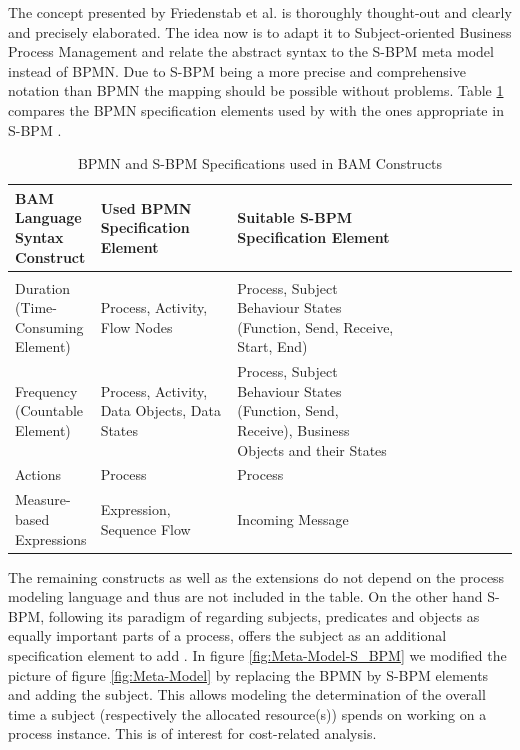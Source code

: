 The concept presented by Friedenstab et al. is thoroughly thought-out and clearly and precisely elaborated. The idea now is to adapt it to Subject-oriented Business Process Management and relate the abstract syntax to the S-BPM meta model instead of BPMN. Due to S-BPM being a more precise and comprehensive notation than BPMN \cite{article:BPMNYAWLPatterns} the mapping should be possible without problems. Table \ref{tbl:MonBPMNSBPM} compares the BPMN specification elements used by \cite{article:BPMNActivityMon} with the ones appropriate in S-BPM \cite{Flei12}.


\begin{table}[htbp]
	\footnotesize
	\centering
	\begin{tabular}[t]{@{}l p{0.3\linewidth} p{0.4\linewidth} p{0.5\linewidth} @{}}
	\toprule
	\textbf{BAM Language Syntax Construct} & \textbf{Used BPMN Specification Element}  & \textbf{Suitable S-BPM Specification Element}\\
	\midrule\\
	Duration (Time-Consuming Element) &	Process, Activity, Flow Nodes&	Process, Subject Behaviour States (Function, Send, Receive, Start, End)
	\\
	Frequency
	(Countable Element)&	Process, Activity, Data Objects, Data States &	Process, Subject Behaviour States (Function, Send, Receive), Business Objects and their States
	\\
	Actions &	Process	 & Process
	\\
	Measure-based Expressions &	Expression, Sequence Flow &	Incoming Message
	\\
	\bottomrule
\end{tabular}
\caption{BPMN and S-BPM Specifications used in BAM Constructs}
\label{tbl:MonBPMNSBPM}
\end{table}

The remaining constructs as well as the extensions do not depend on the process modeling language and thus are not included in the table.
On the other hand S-BPM, following its paradigm of regarding subjects, predicates and objects as equally important parts of a process, offers the subject as an additional specification element to add . In figure \ref{fig:Meta-Model-S_BPM} we modified the picture of figure \ref{fig:Meta-Model} by replacing the BPMN by S-BPM elements and adding the subject. This allows modeling the determination of the overall time a subject (respectively the allocated resource(s)) spends on working on a process instance. This is of interest for cost-related analysis.

